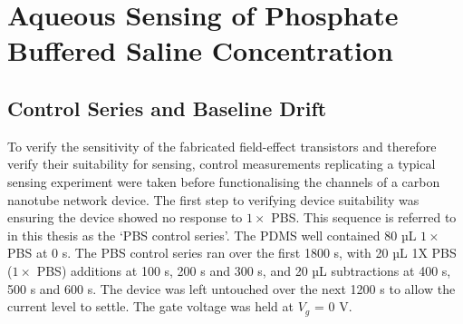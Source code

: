\documentclass[
  a4paper,
]{scrbook}
\begin{document}
\hypertarget{sec-dummy-sensing}{%
\section{Aqueous Sensing of Phosphate Buffered Saline
Concentration}\label{sec-dummy-sensing}}

\hypertarget{sec-baseline-drift}{%
\subsection{Control Series and Baseline
Drift}\label{sec-baseline-drift}}

To verify the sensitivity of the fabricated field-effect transistors and
therefore verify their suitability for sensing, control measurements
replicating a typical sensing experiment were taken before
functionalising the channels of a carbon nanotube network device. The
first step to verifying device suitability was ensuring the device
showed no response to \(1 \times\) PBS. This sequence is referred to in
this thesis as the `PBS control series'. The PDMS well contained 80 µL
\(1 \times\) PBS at 0 s. The PBS control series ran over the first 1800
s, with 20 µL 1X PBS (\(1 \times\) PBS) additions at 100 s, 200 s and
300 s, and 20 µL subtractions at 400 s, 500 s and 600 s. The device was
left untouched over the next 1200 s to allow the current level to
settle. The gate voltage was held at \(V_g\) = 0 V.
\end{document}
